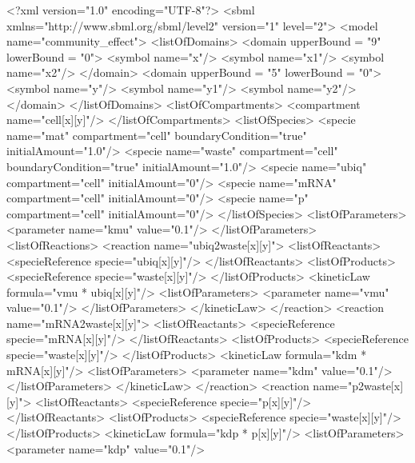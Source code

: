 \documentclass{cekarticle}
\begin{document}
\begin{example}
<?xml version="1.0" encoding="UTF-8"?>
<sbml xmlns="http://www.sbml.org/sbml/level2" version="1" level="2">
<model name="community_effect">
    <listOfDomains>
        <domain upperBound = "9" lowerBound = "0">
            <symbol name="x"/>
            <symbol name="x1"/>
            <symbol name="x2"/>
        </domain>
        <domain upperBound = "5" lowerBound = "0">
            <symbol name="y"/>
            <symbol name="y1"/>
            <symbol name="y2"/>
        </domain>
    </listOfDomains>
    <listOfCompartments>
        <compartment name="cell[x][y]"/>
    </listOfCompartments>
    <listOfSpecies>
        <specie name="mat" compartment="cell" boundaryCondition="true" initialAmount="1.0"/>
        <specie name="waste" compartment="cell" boundaryCondition="true" initialAmount="1.0"/>
        <specie name="ubiq" compartment="cell" initialAmount="0"/>
        <specie name="mRNA" compartment="cell" initialAmount="0"/>
        <specie name="p" compartment="cell" initialAmount="0"/>
    </listOfSpecies>
    <listOfParameters>
        <parameter name="kmu" value="0.1"/>
    </listOfParameters>
    <listOfReactions>
        <reaction name="ubiq2waste[x][y]">
            <listOfReactants>
                <specieReference specie="ubiq[x][y]"/>
            </listOfReactants>
            <listOfProducts>
                <specieReference specie="waste[x][y]"/>
            </listOfProducts>
            <kineticLaw formula="vmu * ubiq[x][y]"/>
                <listOfParameters>
                    <parameter name="vmu" value="0.1"/>
                </listOfParameters>
            </kineticLaw>
        </reaction>
        <reaction name="mRNA2waste[x][y]">
            <listOfReactants>
                <specieReference specie="mRNA[x][y]"/>
            </listOfReactants>
            <listOfProducts>
                <specieReference specie="waste[x][y]"/>
            </listOfProducts>
            <kineticLaw formula="kdm * mRNA[x][y]"/>
                <listOfParameters>
                    <parameter name="kdm" value="0.1"/>
                </listOfParameters>
            </kineticLaw>
        </reaction>
        <reaction name="p2waste[x][y]">
            <listOfReactants>
                <specieReference specie="p[x][y]"/>
            </listOfReactants>
            <listOfProducts>
                <specieReference specie="waste[x][y]"/>
            </listOfProducts>
            <kineticLaw formula="kdp * p[x][y]"/>
                <listOfParameters>
                    <parameter name="kdp" value="0.1"/>

\end{example}
\end{document}
